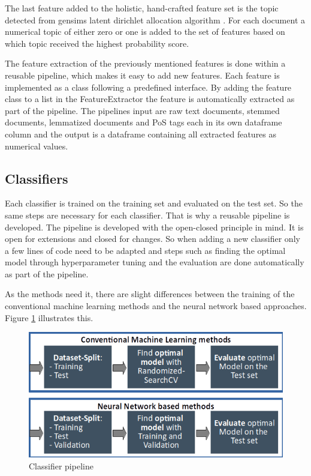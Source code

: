 The last feature added to the holistic, hand-crafted feature set is the topic detected from gensims latent dirichlet allocation algorithm \cite{Fortuna2018}. For each document a numerical topic of either zero or one is added to the set of features based on which topic received the highest probability score. 

The feature extraction of the previously mentioned features is done within a reusable pipeline, which makes it easy to add new features. Each feature is implemented as a class following a predefined interface. By adding the feature class to a list in the Feature\-Extractor the feature is automatically extracted as part of the pipeline. The pipelines input are raw text documents, stemmed documents, lemmatized documents and PoS tags each in its own dataframe column and the output is a dataframe containing all extracted features as numerical values.

\subsection{Classifiers}
\label{ch:approachD}

Each classifier is trained on the training set and evaluated on the test set. So the same steps are necessary for each classifier. That is why a reusable pipeline is developed. The pipeline is developed with the open-closed principle in mind. It is open for extensions and closed for changes. So when adding a new classifier only a few lines of code need to be adapted and steps such as finding the optimal model through hyperparameter tuning and the evaluation are done automatically as part of the pipeline.

As the methods need it, there are slight differences between the training of the conventional machine learning methods and the neural network based approaches. Figure \ref{fig:classifier_pipeline} illustrates this.

\begin{figure}[ht]
	\centering
	\includegraphics[width=0.7\linewidth]{figures/classifier_pipeline.png}
	\caption{Classifier pipeline}
	\label{fig:classifier_pipeline}
\end{figure}


